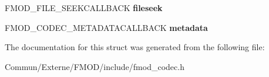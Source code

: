 \begin{DoxyCompactItemize}
\item 
F\+M\+O\+D\+\_\+\+F\+I\+L\+E\+\_\+\+S\+E\+E\+K\+C\+A\+L\+L\+B\+A\+CK {\bfseries fileseek}\hypertarget{struct_f_m_o_d___c_o_d_e_c___s_t_a_t_e_a687641e4351497085141f91e70831928}{}\label{struct_f_m_o_d___c_o_d_e_c___s_t_a_t_e_a687641e4351497085141f91e70831928}

\item 
F\+M\+O\+D\+\_\+\+C\+O\+D\+E\+C\+\_\+\+M\+E\+T\+A\+D\+A\+T\+A\+C\+A\+L\+L\+B\+A\+CK {\bfseries metadata}\hypertarget{struct_f_m_o_d___c_o_d_e_c___s_t_a_t_e_ac567cbf774e3f9dbbc8a3c4dd351ddd4}{}\label{struct_f_m_o_d___c_o_d_e_c___s_t_a_t_e_ac567cbf774e3f9dbbc8a3c4dd351ddd4}

\end{DoxyCompactItemize}


The documentation for this struct was generated from the following file\+:\begin{DoxyCompactItemize}
\item 
Commun/\+Externe/\+F\+M\+O\+D/include/fmod\+\_\+codec.\+h\end{DoxyCompactItemize}
